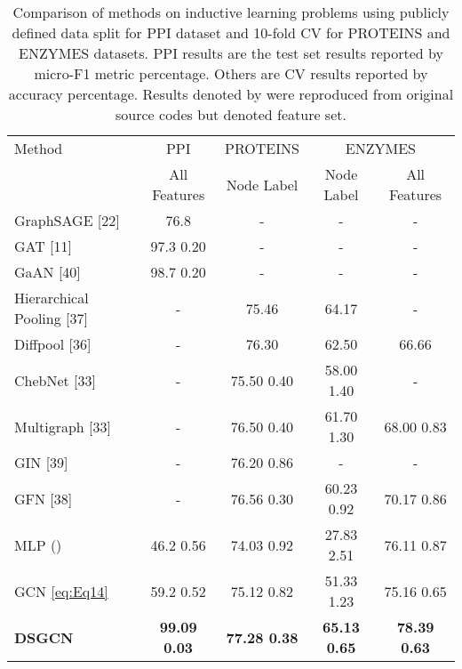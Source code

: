 \documentclass{article}
\begin{document}
\begin{table}\renewcommand{\arraystretch}{1.3}
\caption{Comparison of methods on inductive learning problems using publicly defined data split for PPI dataset and 10-fold CV for PROTEINS and ENZYMES datasets. PPI results are the test set results reported by micro-F1 metric percentage. Others are CV results reported by accuracy percentage. Results denoted by  were reproduced from original source codes but denoted feature set.}
\centering


\begin{tabular}{@{}l @{~}c c c c @{}}
\toprule
Method &  PPI & PROTEINS & \multicolumn{2}{c}{ENZYMES} \\
 & All Features & Node Label & Node Label & All Features \\
\midrule

GraphSAGE [22]  &76.8   & - &-&-
 \\

GAT [11]  
&97.3   0.20  & - &- &-
 \\ 
GaAN [40]  
&98.7   0.20  & - &- &-
 \\ 

Hierarchical Pooling
[37]
&   -
& 75.46 & 64.17 & - \\ 

Diffpool [36]
&   - 
& 76.30  & 62.50 & 66.66 \\ 

ChebNet [33]
&   -
&75.50  0.40 &58.00  1.40 &-  \\

Multigraph [33]
&  - 
&76.50  0.40  &61.70  1.30 &68.00  0.83 \\

GIN [39] & - & 76.20  0.86 & - & - \\
GFN [38]
&   -
& 76.56  0.30  & 60.23  0.92  & 70.17  0.86  \\

\midrule

MLP () 
& 46.2  0.56  
& 74.03  0.92
& 27.83  2.51 
& 76.11  0.87   
\\

GCN \eqref{eq:Eq14}    
& 59.2  0.52  
& 75.12  0.82
& 51.33  1.23
& 75.16  0.65
\\

\textbf{DSGCN} 
&\textbf{99.09  0.03}   
&\textbf{77.28  0.38}
&\textbf{65.13  0.65}
&\textbf{78.39  0.63} \\ 
\bottomrule
\end{tabular}
\label{tableindres}
\medskip
\end{table}
\end{document}
